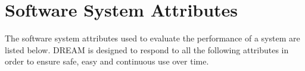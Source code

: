 \section{Software System Attributes}

The software system attributes used to evaluate the performance of a system are listed below. DREAM is designed to respond to all the following attributes in order to ensure safe, easy and continuous use over time.





